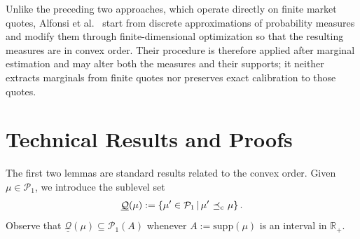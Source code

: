 \documentclass[11pt]{article}
\newcommand{\cP}{\mathcal{P}}
\newcommand{\cQ}{\mathcal{Q}}
\newcommand{\R}{\mathbb{R}} %
\newcommand{\supp}{\mathrm{supp}} %
\theoremstyle{plain}
\theoremstyle{definition}
\theoremstyle{remark}
\DeclareMathOperator{\cleq}{\,\preceq_{\rm c}\,}
\theoremstyle{plain}
\begin{document}
Unlike the preceding two approaches, which operate directly on finite market quotes, Alfonsi et al.~\cite{Alfonsi2019sampling,Alfonsi2020sampling} start from discrete approximations of probability measures and modify them through finite-dimensional optimization so that the resulting measures are in convex order. Their procedure is therefore applied after marginal estimation and may alter both the measures and their supports; it neither extracts marginals from finite quotes nor preserves exact calibration to those quotes.




%

%

%
%
%
%
%
%

%
%
%
%

%
%
%
%

%
%
%
%
%
%
%
%
%

%
%
%
%
%
%
%
%
%

%

%
%
%
%
%
%
%
%
%
%
%
%
%
%
%
%
%
%
%
%
%
%
%
%
%
%
%
%
%
%
%
%
%
%
%
%
%
%
%
%
%
%
%
%
%
%
%
%
%
%
%
%
%
%
%
%
%
%
%
%
%
%
%
%
%
%
%
%
%
%
%


%
%
%
%
%
%
%
%
%
%
%
%
%
%
%
%
%
%


%
%
%
%
%
%
%
%
%
%
%
%
%
%
%
%
%
%



\section{Technical Results and Proofs}\label{app:proof}

The first two lemmas are standard results related to the convex order. Given $\mu\in\cP_1$, we introduce the sublevel set
%
%
%
%
%
%
\begin{equation*}%
\underline{\cQ}(\mu)
:= \left\{ \mu' \in \cP_1 \,\middle|\, \mu' \cleq \mu \right\}.
\end{equation*}
Observe that $\underline{\cQ}(\mu) \subseteq \cP_1(A)$ whenever $A := \supp(\mu)$ is an interval in $\R_+$.
\end{document}
